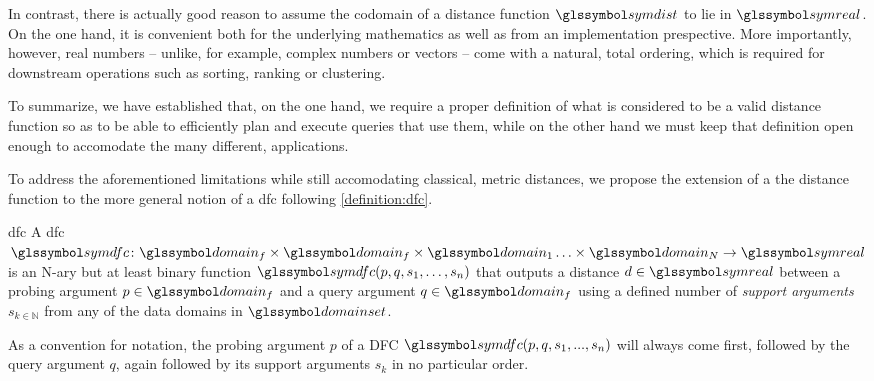 In contrast, there is actually good reason to assume the codomain of a distance function  $\symdist$ to lie in $\symreal$. On the one hand, it is convenient both for the underlying mathematics as well as from an implementation prespective. More importantly, however, real numbers -- unlike, for example, complex numbers or vectors -- come with a natural, total ordering, which is required for downstream operations such as sorting, ranking or clustering.

To summarize, we have established that, on the one hand, we require a proper definition of what is considered to be a valid distance function so as to be able to efficiently plan and execute queries that use them, while on the other hand we must keep that definition open enough to accomodate the many different, applications.

To address the aforementioned limitations while still accomodating classical, metric distances, we propose the extension of a the distance function to the more general notion of a \acrfull{dfc} following \cref{definition:dfc}.

\begin{definition}[label=definition:dfc]{\acrlong{dfc}}{}
    A \acrshort{dfc} $\symdfc \colon \domain_f \times \domain_f \times \domain_{1} \ldots \times \domain_{N} \to \symreal$ is an N-ary but at least binary function $\symdfc(p,q,s_1,\ldots,s_n)$ that outputs a distance $d \in \symreal$ between a probing argument $p \in \domain_f$ and a query argument $q \in \domain_f$ using a defined number of \emph{support arguments} $s_{k \in \mathbb{N}}$ from any of the data domains in $\domainset$.

    As a convention for notation, the probing argument $p$ of a DFC $\symdfc(p,q,s_1,...,s_n)$ will always come first, followed by the query argument $q$, again followed by its support arguments $s_k$ in no particular order.
\end{definition}

